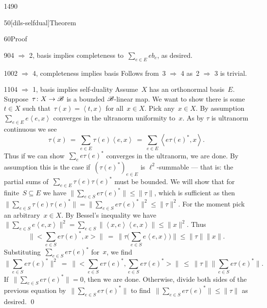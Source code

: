 \begin{parsec}{1490}
\begin{point}{50}[dils-selfdual]{Theorem}
\begin{point}{60}{Proof}
\begin{point}{90}{4 $\Rightarrow$ 2, basis implies completeness}
to~$\sum_{e \in E} e b_e$, as desired.
\end{point}
\begin{point}{100}{2 $\Rightarrow$ 4, completeness implies basis}%
    Follows from~3 $\Rightarrow$ 4
        as~2 $\Rightarrow$ 3 is trivial.
\end{point}
\begin{point}{110}{4 $\Rightarrow$ 1, basis implies self-duality}%
    Assume~$X$ has an orthonormal basis~$E$.
    Suppose~$\tau\colon X \to \mathscr{B}$ is a bounded $\mathscr{B}$-linear map.
    We want to show there is some~$t \in X$
    such that~$\tau(x) = \left<t,x\right>$ for all~$x \in X$.
    Pick any~$x \in X$.
    By assumption~$\sum_{e \in E} e  \left<e,x\right>$
        converges in the ultranorm uniformity to~$x$.
As by  $\tau$ is ultranorm continuous
        we see
        \begin{equation*}
            \tau(x) \ =\  \sum_{e \in E} \tau(e) \left<e,x\right>
                \ =\  \sum_{e \in E} \left<e \tau(e)^*,x\right>.
        \end{equation*}
    Thus if we can show~$\sum_e e \tau(e)^*$ converges in the ultranorm,
        we are done. By assumption this is
            the case if~$(\tau(e)^*)_{e \in E} $ is $\ell^2$-summable
            --- that is: the partial sums of~$\sum_{e \in E} \tau(e)\tau(e)^*$
                must be bounded.
        We will show
        that for finite~$S \subseteq E$
        we have
        $\|\sum_{e \in S} e \tau(e)^* \|\leq \|\tau\|$,
        which is sufficient as then~$ \| \sum_{e \in S}  \tau(e)\tau(e)^* \|
        =\|\sum_{e \in S} e \tau(e)^* \|^2  \leq \|\tau\|^2$.
For the moment pick an arbitrary~$x \in X$.
By Bessel's inequality
we have~$
\| \sum_{e\in S} e \left<e,x\right>\|^2
    = \sum_{e\in S} \|\left<x,e\right>\left<e,x\right>\|
    \leq \|x\|^2$.
Thus
    \begin{equation*}
        \bigl\|\bigl< \sum_{e \in S} e \tau(e)^*,x\bigr>\bigr\|
        \ =\  \bigl\| \tau \bigl(\sum_{e \in S} e\left<e,x\right>\bigr) \bigr\|
        \leq \|\tau\| \|x\|.
    \end{equation*}
Substituting~$\sum_{e \in S} e \tau(e)^*$ for~$x$, we find
\begin{equation*}
    \| \sum_{e\in S}e \tau(e)^*\|^2 \ =\ 
    \bigl\|\bigl< \sum_{e \in S} e \tau(e)^*,\sum_{e \in S} e\tau(e)^*\bigr>\bigr\|
    \ \leq \ \|\tau\| \bigl\| \sum_{e\in S}e \tau(e)^*\bigr\|.
\end{equation*}
If~$ \| \sum_{e\in S}e \tau(e)^*\| = 0$,
then we are done.
Otherwise, divide both sides of the previous equation
by~$ \| \sum_{e\in S}e \tau(e)^*\|$
to find~$ \| \sum_{e\in S}e \tau(e)^*\| \leq \|\tau\|$ as desired. \qed
\end{point}
\end{point}
\end{point}
\end{parsec}

